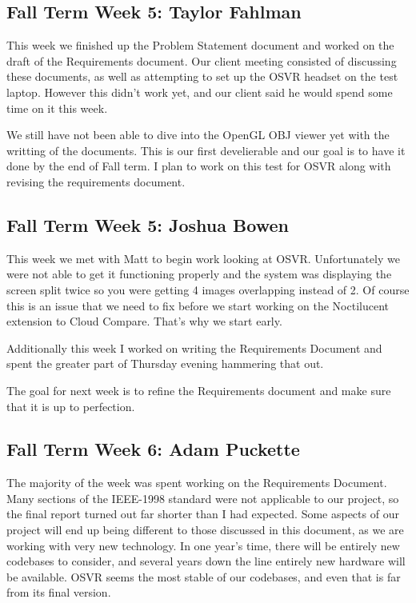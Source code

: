 \documentclass[draftclsnofoot,onecolumn]{IEEEtran}
\begin{document}
\subsection{Fall Term Week 5: Taylor Fahlman}

This week we finished up the Problem Statement document and worked on the draft of the Requirements document. Our client meeting consisted of discussing these documents, as well as attempting to set up the OSVR headset on the test laptop. However this didn't work yet, and our client said he would spend some time on it this week.

We still have not been able to dive into the OpenGL OBJ viewer yet with the writting of the documents. This is our first develierable and our goal is to have it done by the end of Fall term. I plan to work on this test for OSVR along with revising the requirements document.

\subsection{Fall Term Week 5: Joshua Bowen}

This week we met with Matt to begin work looking at OSVR. Unfortunately we were not able to get it functioning properly and the system was displaying the screen split twice so you were getting 4 images overlapping instead of 2. Of course this is an issue that we need to fix before we start working on the Noctilucent extension to Cloud Compare. That's why we start early.

Additionally this week I worked on writing the Requirements Document and spent the greater part of Thursday evening hammering that out.

The goal for next week is to refine the Requirements document and make sure that it is up to perfection.

\subsection{Fall Term Week 6: Adam Puckette}

The majority of the week was spent working on the Requirements Document. Many sections of the IEEE-1998 standard were not applicable to our project, so the final report turned out far shorter than I had expected. Some aspects of our project will end up being different to those discussed in this document, as we are working with very new technology. In one year's time, there will be entirely new codebases to consider, and several years down the line entirely new hardware will be available. OSVR seems the most stable of our codebases, and even that is far from its final version.
\end{document}
